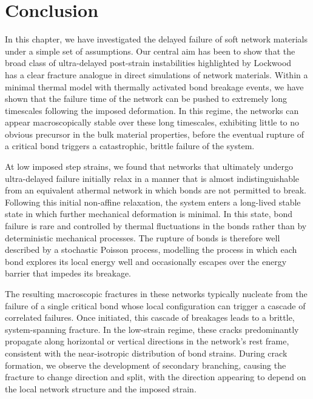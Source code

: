 \documentclass[asymmetricmargins]{library/duthesis}%
\begin{document}
\section{Conclusion}
In this chapter, we have investigated the delayed failure of soft network materials under a simple set of assumptions. Our central aim has been to show that the broad class of ultra-delayed post-strain instabilities highlighted by Lockwood \etal~\cite{lockwood_ultradelayed_2025} has a clear fracture analogue in direct simulations of network materials. Within a minimal thermal model with thermally activated bond breakage events, we have shown that the failure time of the network can be pushed to extremely long timescales following the imposed deformation. In this regime, the networks can appear macroscopically stable over these long timescales, exhibiting little to no obvious precursor in the bulk material properties, before the eventual rupture of a critical bond triggers a catastrophic, brittle failure of the system.

At low imposed step strains, we found that networks that ultimately undergo ultra-delayed failure initially relax in a manner that is almost indistinguishable from an equivalent athermal network in which bonds are not permitted to break. Following this initial non-affine relaxation, the system enters a long-lived stable state in which further mechanical deformation is minimal. In this state, bond failure is rare and controlled by thermal fluctuations in the bonds rather than by deterministic mechanical processes. The rupture of bonds is therefore well described by a stochastic Poisson process, modelling the process in which each bond explores its local energy well and occasionally escapes over the energy barrier that impedes its breakage. 

The resulting macroscopic fractures in these networks typically nucleate from the failure of a single critical bond whose local configuration can trigger a cascade of correlated failures. Once initiated, this cascade of breakages leads to a brittle, system-spanning fracture. In the low-strain regime, these cracks predominantly propagate along horizontal or vertical directions in the network's rest frame, consistent with the near-isotropic distribution of bond strains. During crack formation, we observe the development of secondary branching, causing the fracture to change direction and split, with the direction appearing to depend on the local network structure and the imposed strain. 
\end{document}
